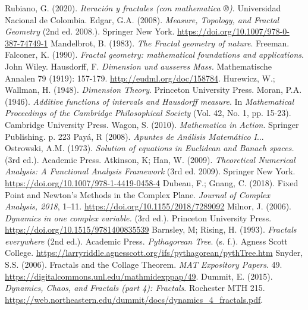 \begin{thebibliography}{99}
    
 Rubiano, G. (2020). \textit{Iteración y fractales (con mathematica ®)}. Universidad Nacional de Colombia.
 Edgar, G.A. (2008). \textit{Measure, Topology, and Fractal Geometry} (2nd ed. 2008.). Springer New York. \url{https://doi.org/10.1007/978-0-387-74749-1}
 Mandelbrot, B. (1983). \textit{The Fractal geometry of nature}. Freeman.
 Falconer, K. (1990). \textit{Fractal geometry: mathematical foundations and applications}. John Wiley.
 Hausdorff, F. \textit{Dimension und ausseres Mass.} Mathematische Annalen 79 (1919): 157-179. \url{http://eudml.org/doc/158784}.
Hurewicz, W.; Wallman, H. (1948). \textit{Dimension Theory}. Princeton University Press.
Moran, P.A. (1946). \textit{Additive functions of intervals and Hausdorff measure}. In \textit{Mathematical Proceedings of the Cambridge Philosophical Society} (Vol. 42, No. 1, pp. 15-23). Cambridge University Press.
Wagon, S. (2010). \textit{Mathematica in Action}. Springer Publishing. p. 223
 Payá, R (2008). \textit{Apuntes de Análisis Matemático I}...
 Ostrowski, A.M. (1973). \textit{Solution of equations in Euclidean and Banach spaces.} (3rd ed.). Academic Press.
 Atkinson, K; Han, W. (2009). \textit{Theoretical Numerical Analysis: A Functional Analysis Framework} (3rd ed. 2009). Springer New York. \url{https://doi.org/10.1007/978-1-4419-0458-4}
 Dubeau, F.; Gnang, C. (2018). Fixed Point and Newton’s Methods in the Complex Plane. \textit{Journal of Complex Analysis, 2018}, 1–11. \url{https://doi.org/10.1155/2018/7289092}
 Milnor, J. (2006). \textit{Dynamics in one complex variable.} (3rd ed.). Princeton University Press. \url{https://doi.org/10.1515/9781400835539}
 Barnsley, M; Rising, H. (1993). \textit{Fractals everywhere} (2nd ed.). Academic Press.
 \textit{Pythagorean Tree}. (s. f.). Agness Scott College. \url{https://larryriddle.agnesscott.org/ifs/pythagorean/pythTree.htm}
 Snyder, S.S. (2006). Fractals and the Collage Theorem. \textit{MAT Expository Papers}. 49. \url{https://digitalcommons.unl.edu/mathmidexppap/49}.
 Dummit, E. (2015). \textit{Dynamics, Chaos, and Fractals (part 4): Fractals}. Rochester MTH 215. \url{https://web.northeastern.edu/dummit/docs/dynamics_4_fractals.pdf}.


\end{thebibliography}

